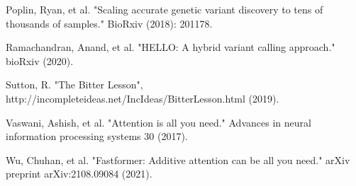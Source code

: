\documentclass[]{article}
\begin{document}
\vspace{8pt}
Poplin, Ryan, et al. "Scaling accurate genetic variant discovery to tens of thousands of samples." BioRxiv (2018): 201178.

\vspace{8pt}
Ramachandran, Anand, et al. "HELLO: A hybrid variant calling approach." bioRxiv (2020).
 
\vspace{8pt}
Sutton, R. "The Bitter Lesson", http://incompleteideas.net/IncIdeas/BitterLesson.html (2019).

\vspace{8pt}
Vaswani, Ashish, et al. "Attention is all you need." Advances in neural information processing systems 30 (2017).


\vspace{8pt}
Wu, Chuhan, et al. "Fastformer: Additive attention can be all you need." arXiv preprint arXiv:2108.09084 (2021).
\end{document}
